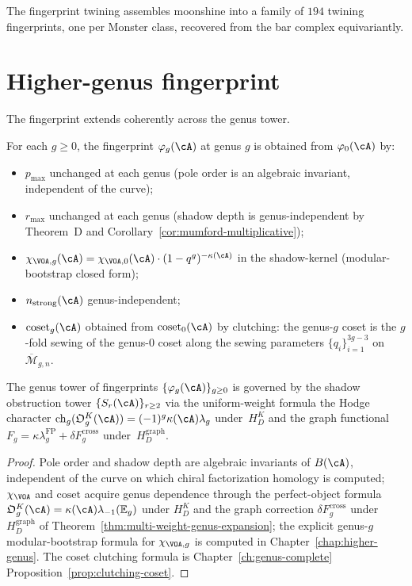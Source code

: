 The fingerprint twining assembles moonshine into a family of
$194$ twining fingerprints, one per Monster class,
recovered from the bar complex equivariantly.

\section{Higher-genus fingerprint}
\label{sec:part-ii-higher-genus}

The fingerprint extends coherently across the genus tower.

\begin{proposition}
\label{prop:part-ii-higher-genus-fingerprint}
For each $g \ge 0$, the fingerprint $\varphi_g(\cA)$ at genus $g$
is obtained from $\varphi_0(\cA)$ by:
\begin{itemize}
 \item $p_{\max}$ unchanged at each genus \textup{(}pole order is
 an algebraic invariant, independent of the curve\textup{)};
 \item $r_{\max}$ unchanged at each genus \textup{(}shadow depth
 is genus-independent by Theorem~D and
 Corollary~\ref{cor:mumford-multiplicative}\textup{)};
 \item $\chi_{\VOA, g}(\cA) = \chi_{\VOA, 0}(\cA) \cdot
 (1 - q^g)^{-\kappa(\cA)}$ in the shadow-kernel
 \textup{(}modular-bootstrap closed form\textup{)};
 \item $n_{\mathrm{strong}}(\cA)$ genus-independent;
 \item $\mathrm{coset}_g(\cA)$ obtained from $\mathrm{coset}_0(\cA)$
 by clutching: the genus-$g$ coset is the $g$-fold sewing of
 the genus-$0$ coset along the sewing parameters
 $\{q_i\}_{i=1}^{3g-3}$ on $\overline{\mathcal{M}}_{g,n}$.
\end{itemize}
The genus tower of fingerprints $\{\varphi_g(\cA)\}_{g \ge 0}$ is
governed by the shadow obstruction tower
$\{S_r(\cA)\}_{r \ge 2}$ via the uniform-weight formula
the Hodge character
$\operatorname{ch}_g(\mathfrak O_g^K(\cA))=
(-1)^g\kappa(\cA)\lambda_g$ under~$H_D^K$ and the graph functional
$F_g=\kappa\lambda_g^{\mathrm{FP}}+\delta F_g^{\mathrm{cross}}$
under~$H_D^{\mathrm{graph}}$.
\end{proposition}

\begin{proof}
Pole order and shadow depth are algebraic invariants of $B(\cA)$,
independent of the curve on which chiral factorization homology
is computed; $\chi_{\VOA}$ and $\mathrm{coset}$ acquire genus
dependence through the perfect-object formula
$\mathfrak O_g^K(\cA)=\kappa(\cA)\lambda_{-1}(\mathbb E_g)$ under
$H_D^K$ and the graph correction
$\delta F_g^{\mathrm{cross}}$ under~$H_D^{\mathrm{graph}}$ of
Theorem~\ref{thm:multi-weight-genus-expansion}; the explicit
genus-$g$ modular-bootstrap formula for $\chi_{\VOA, g}$ is
computed in Chapter~\ref{chap:higher-genus}. The coset clutching
formula is Chapter~\ref{ch:genus-complete}
Proposition~\ref{prop:clutching-coset}.
\end{proof}

